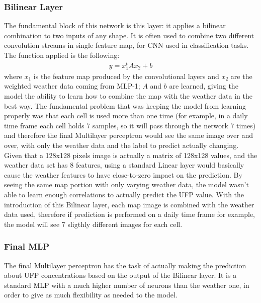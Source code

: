 \documentclass[11pt,a4paper,titlepage]{book}
\begin{document}
\subsubsection{Bilinear Layer}
The fundamental block of this network is this layer: it applies a bilinear combination to two inputs of any shape. It is often used to combine two different convolution streams in single feature map, for CNN used in classification tasks.
\newline
\newline
The function applied is the following:
\begin{align}
    y = x_1^t A x_2 + b
\end{align}
where $x_1$ is the feature map produced by the convolutional layers and $x_2$ are the weighted weather data coming from MLP-1; $A$ and $b$ are learned, giving the model the ability to learn how to combine the map with the weather data in the best way.
\newline
\newline
The fundamental problem that was keeping the model from learning properly was that each cell is used more than one time (for example, in a daily time frame each cell holds 7 samples, so it will pass through the network 7 times) and therefore the final Multilayer perceptron would see the same image over and over, with only the weather data and the label to predict actually changing. Given that a 128x128 pixels image is actually a matrix of 128x128 values, and the weather data set has 8 features, using a standard Linear layer would basically cause the weather features to have close-to-zero impact on the prediction.
\newline
\newline
By seeing the same map portion with only varying weather data, the model wasn't able to learn enough correlations to actually predict the UFP value. With the introduction of this Bilinear layer, each map image is combined with the weather data used, therefore if prediction is performed on a daily time frame for example, the model will see 7 sligthly different images for each cell.
\subsubsection{Final MLP}
The final Multilayer perceptron has the task of actually making the prediction about UFP concentrations based on the output of the Bilinear layer. It is a standard MLP with a much higher number of neurons than the weather one, in order to give as much flexibility as needed to the model.
\end{document}
